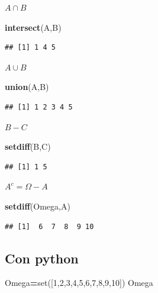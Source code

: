 \documentclass[]{book}
\newenvironment{Shaded}{\begin{snugshade}}{\end{snugshade}}
\newcommand{\BuiltInTok}[1]{#1}
\newcommand{\DecValTok}[1]{\textcolor[rgb]{0.00,0.00,0.81}{#1}}
\newcommand{\KeywordTok}[1]{\textcolor[rgb]{0.13,0.29,0.53}{\textbf{#1}}}
\newcommand{\NormalTok}[1]{#1}
\newcommand{\OperatorTok}[1]{\textcolor[rgb]{0.81,0.36,0.00}{\textbf{#1}}}
\begin{document}
\(A\cap B\)

\begin{Shaded}
\begin{Highlighting}[]
\KeywordTok{intersect}\NormalTok{(A,B)}
\end{Highlighting}
\end{Shaded}

\begin{verbatim}
## [1] 1 4 5
\end{verbatim}

\(A\cup B\)

\begin{Shaded}
\begin{Highlighting}[]
\KeywordTok{union}\NormalTok{(A,B)}
\end{Highlighting}
\end{Shaded}

\begin{verbatim}
## [1] 1 2 3 4 5
\end{verbatim}

\(B-C\)

\begin{Shaded}
\begin{Highlighting}[]
\KeywordTok{setdiff}\NormalTok{(B,C)}
\end{Highlighting}
\end{Shaded}

\begin{verbatim}
## [1] 1 5
\end{verbatim}

\(A^c=\Omega-A\)

\begin{Shaded}
\begin{Highlighting}[]
\KeywordTok{setdiff}\NormalTok{(Omega,A)}
\end{Highlighting}
\end{Shaded}

\begin{verbatim}
## [1]  6  7  8  9 10
\end{verbatim}

\hypertarget{con-python}{%
\subsection{Con python}\label{con-python}}

\begin{Shaded}
\begin{Highlighting}[]
\NormalTok{Omega}\OperatorTok{=}\BuiltInTok{set}\NormalTok{([}\DecValTok{1}\NormalTok{,}\DecValTok{2}\NormalTok{,}\DecValTok{3}\NormalTok{,}\DecValTok{4}\NormalTok{,}\DecValTok{5}\NormalTok{,}\DecValTok{6}\NormalTok{,}\DecValTok{7}\NormalTok{,}\DecValTok{8}\NormalTok{,}\DecValTok{9}\NormalTok{,}\DecValTok{10}\NormalTok{])}
\NormalTok{Omega}
\end{Highlighting}
\end{Shaded}
\end{document}
